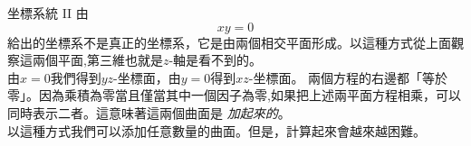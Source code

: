 \begin{surferPage}{坐標系統 II}
由\[xy=0\]給出的坐標系不是真正的坐標系，它是由兩個相交平面形成。以這種方式從上面觀察這兩個平面,第三維也就是$z$-軸是看不到的。
\\
\vspace{0.3cm}
由$x=0$我們得到$yz$-坐標面，由$y=0$得到$xz$-坐標面。
兩個方程的右邊都「等於零」。因為乘積為零當且僅當其中一個因子為零,如果把上述兩平面方程相乘，可以同時表示二者。這意味著這兩個曲面是\textit{ 加起來的}。 \\
以這種方式我們可以添加任意數量的曲面。但是，計算起來會越來越困難。
\end{surferPage}

